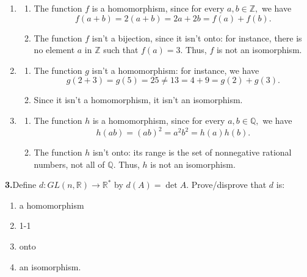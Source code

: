 \documentclass[10pt,]{book}
\theoremstyle{plain}
\theoremstyle{definition}
\theoremstyle{definition}
\theoremstyle{definition}
\theoremstyle{definition}
\numberwithin{equation}{section}
\def\Z{\mathbb{Z}}
\def\R{\mathbb{R}}
\def\Q{\mathbb{Q}}
\begin{document}
\begin{enumerate}[label=(\alph*)]
\item\hypertarget{li-168}{}%
\begin{enumerate}[label=\roman*.]
\item\hypertarget{li-169}{}The function \(f\) is a homomorphism, since for every \(a,b \in
\Z,\) we have%
\begin{equation*}
f(a+b)=2(a+b)=2a+2b=f(a)+f(b).
\end{equation*}
%
\item\hypertarget{li-170}{}The function \(f\) isn't a bijection, since it isn't onto: for instance, there is no element \(a\) in \(\Z\) such that \(f(a)=3\). Thus, \(f\) is not an isomorphism.%
\end{enumerate}
%
\item\hypertarget{li-171}{}%
\begin{enumerate}[label=\roman*.]
\item\hypertarget{li-172}{}The function \(g\) isn't a homomorphism: for instance, we have%
\begin{equation*}
g(2+3)=g(5)=25\neq 13=4+9=g(2)+g(3).
\end{equation*}
%
\item\hypertarget{li-173}{}Since it isn't a homomorphism, it isn't an isomorphism.%
\end{enumerate}
%
\item\hypertarget{li-174}{}%
\begin{enumerate}[label=\roman*.]
\item\hypertarget{li-175}{}The function \(h\) is a homomorphism, since for every \(a,b \in
\Q,\) we have%
\begin{equation*}
h(ab)=(ab)^2=a^2b^2=h(a)h(b).
\end{equation*}
%
\item\hypertarget{li-176}{}The function \(h\) isn't onto: its range is the set of nonnegative rational numbers, not all of \(\Q\). Thus, \(h\) is not an isomorphism.%
\end{enumerate}
%
\end{enumerate}
\par\smallskip
\noindent\textbf{3.}\quad{}Define \(d : GL(n,\R)\to \R^*\) by \(d(A)=\det A\). Prove/disprove that \(d\) is: \leavevmode%
\begin{enumerate}[label=(\alph*)]
\item\hypertarget{li-177}{}a homomorphism%
\item\hypertarget{li-178}{}1-1%
\item\hypertarget{li-179}{}onto%
\item\hypertarget{li-180}{}an isomorphism.%
\end{enumerate}
\end{document}
